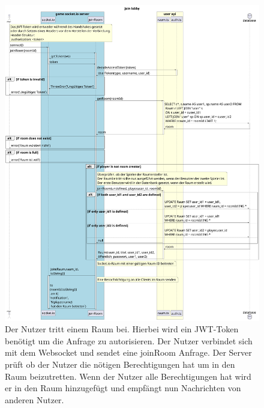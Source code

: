 \documentclass[
]{article}
\begin{document}
\begin{figure}[H]
	\centering
	\includegraphics[width=\textwidth ]{resources/join_lobby.pdf}
	\caption{Der Nutzer tritt einem Raum bei. Hierbei wird ein JWT-Token benötigt um die Anfrage zu autorisieren. Der Nutzer verbindet sich mit dem Websocket und sendet eine joinRoom Anfrage. Der Server prüft ob der Nutzer die nötigen Berechtigungen hat um in den Raum beizutretten. Wenn der Nutzer alle Berechtigungen hat wird er in den Raum hinzugefügt und empfängt nun Nachrichten von anderen Nutzer.}
	\label{fig:ablaufdiagramm-join_lobby}
\end{figure}
\end{document}
